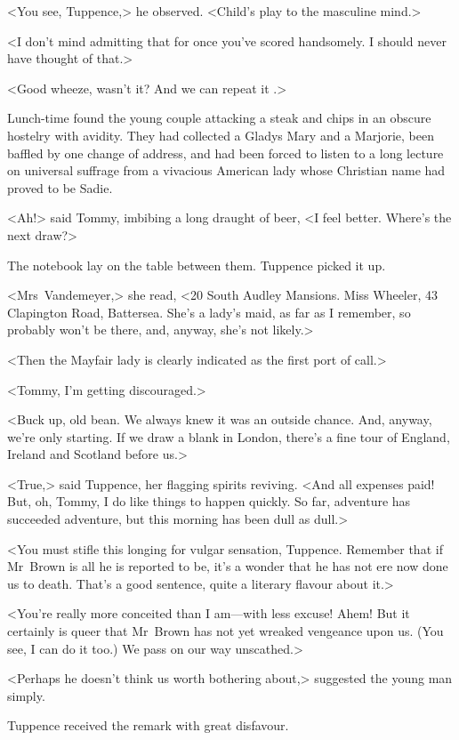 <You see, Tuppence,> he observed. <Child's play to the masculine mind.>

<I don't mind admitting that for once you've scored handsomely. I should never have thought of that.>

<Good wheeze, wasn't it? And we can repeat it .>

Lunch-time found the young couple attacking a steak and chips in an obscure hostelry with avidity. They had collected a Gladys Mary and a Marjorie, been baffled by one change of address, and had been forced to listen to a long lecture on universal suffrage from a vivacious American lady whose Christian name had proved to be Sadie.

<Ah!> said Tommy, imbibing a long draught of beer, <I feel better. Where's the next draw?>

The notebook lay on the table between them. Tuppence picked it up.

<Mrs~Vandemeyer,> she read, <20 South Audley Mansions. Miss Wheeler, 43 Clapington Road, Battersea. She's a lady's maid, as far as I remember, so probably won't be there, and, anyway, she's not likely.>

<Then the Mayfair lady is clearly indicated as the first port of call.>

<Tommy, I'm getting discouraged.>

<Buck up, old bean. We always knew it was an outside chance. And, anyway, we're only starting. If we draw a blank in London, there's a fine tour of England, Ireland and Scotland before us.>

<True,> said Tuppence, her flagging spirits reviving. <And all expenses paid! But, oh, Tommy, I do like things to happen quickly. So far, adventure has succeeded adventure, but this morning has been dull as dull.>

<You must stifle this longing for vulgar sensation, Tuppence. Remember that if Mr~Brown is all he is reported to be, it's a wonder that he has not ere now done us to death. That's a good sentence, quite a literary flavour about it.>

<You're really more conceited than I am—with less excuse! Ahem! But it certainly is queer that Mr~Brown has not yet wreaked vengeance upon us. (You see, I can do it too.) We pass on our way unscathed.>

<Perhaps he doesn't think us worth bothering about,> suggested the young man simply.

Tuppence received the remark with great disfavour.

